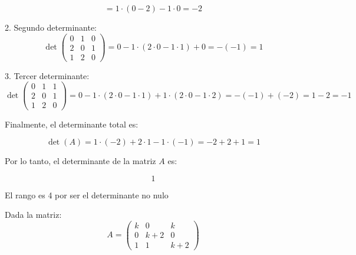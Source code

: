\documentclass[addpoints,spanish, 12pt,a4paper]{exam}
\begin{document}
\begin{questions}
\begin{solution}
        \[
        = 1 \cdot (0 - 2) - 1 \cdot 0 = -2
        \]
        
        2. Segundo determinante:
        \[
        \det \begin{pmatrix}
        0 & 1 & 0 \\
        2 & 0 & 1 \\
        1 & 2 & 0
        \end{pmatrix}
        = 0 - 1 \cdot (2 \cdot 0 - 1 \cdot 1) + 0 = -(-1) = 1
        \]
        
        3. Tercer determinante:
        \[
        \det \begin{pmatrix}
        0 & 1 & 1 \\
        2 & 0 & 1 \\
        1 & 2 & 0
        \end{pmatrix}
        = 0 - 1 \cdot (2 \cdot 0 - 1 \cdot 1) + 1 \cdot (2 \cdot 0 - 1 \cdot 2) = -(-1) + (-2) = 1 - 2 = -1
        \]
        
        Finalmente, el determinante total es:
        
        \[
        \det(A) = 1 \cdot (-2) + 2 \cdot 1 - 1 \cdot (-1) = -2 + 2 + 1 = 1
        \]
        
        Por lo tanto, el determinante de la matriz \(A\) es:
        
        \[
        \boxed{1}
        \]

        El rango es 4 por ser el determinante no nulo
    
    \end{solution}



\question[2] Dada la matriz: $$A=\left(\begin{matrix}k & 0 & k\\0 & k + 2 & 0\\1 & 1 & k + 2\end{matrix}\right)$$ 

\begin{parts}



\end{parts}
\end{questions}
\end{document}
